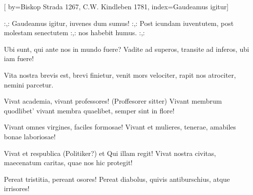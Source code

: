 [
by={Biskop Strada 1267, C.W. Kindleben 1781},
index={Gaudeamus igitur}]

\beginverse*
:,: Gaudeamus igitur,
iuvenes dum sumus! :,:
Post icundam iuventutem,
post molestam senectutem
:,: nos habebit humus. :,:
\endverse	

\beginverse*
Ubi sunt, qui ante nos
in mundo fuere?
Vadite ad superos,
transite ad inferos,
ubi iam fuere!
\endverse	

\beginverse*
Vita nostra brevis est,
brevi finietur,
venit mors velociter,
rapit nos atrociter,
nemini parcetur.
\endverse	

\beginverse*
Vivat academia, 
vivant professores! (Proffesorer sitter)
Vivant membrum quodlibet'
vivant membra quaelibet,
semper sint in flore!
\endverse	

\beginverse*
Vivant omnes virgines,
faciles formosae!
Vivant et mulieres,
tenerae, amabiles
bonae laboriosae!
\endverse	

\beginverse*
Vivat et respublica (Politiker?)
et Qui illam regit!
Vivat nostra civitas,
maecenatum caritas,
quae nos hic protegit!
\endverse	

\beginverse*
Pereat tristitia,
pereant osores!
Pereat diabolus,
quivis antiburschius,
atque irrisores!
\endverse	

\vspace{1cm}
\endsong


